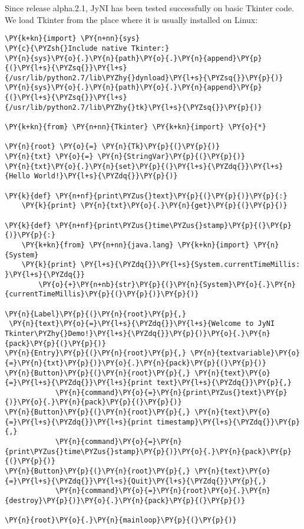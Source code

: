 \documentclass[letterpaper,compsoc,twoside]{IEEEtran}
\makeatletter
\def\PY@reset{\let\PY@it=\relax \let\PY@bf=\relax \let\PY@ul=\relax \let\PY@tc=\relax \let\PY@bc=\relax \let\PY@ff=\relax}
\def\PY@tok#1{\csname PY@tok@#1\endcsname}
\def\PY@toks#1+{\ifx\relax#1\empty\else \PY@tok{#1}\expandafter\PY@toks\fi}
\def\PY@do#1{\PY@bc{\PY@tc{\PY@ul{\PY@it{\PY@bf{\PY@ff{#1}}}}}}}
\def\PY#1#2{\PY@reset\PY@toks#1+\relax+\PY@do{#2}}
\def\PYZus{\char`\_}
\def\PYZsh{\char`\#}
\def\PYZhy{\char`\-}
\def\PYZsq{\char`\'}
\def\PYZdq{\char`\"}
\makeatother
\begin{document}
Since release alpha.2.1, JyNI has been tested successfully on basic Tkinter code.
We load Tkinter from the place where it is usually installed on Linux:\begin{Verbatim}[commandchars=\\\{\},fontsize=\footnotesize]
\PY{k+kn}{import} \PY{n+nn}{sys}
\PY{c}{\PYZsh{}Include native Tkinter:}
\PY{n}{sys}\PY{o}{.}\PY{n}{path}\PY{o}{.}\PY{n}{append}\PY{p}{(}\PY{l+s}{\PYZsq{}}\PY{l+s}{/usr/lib/python2.7/lib\PYZhy{}dynload}\PY{l+s}{\PYZsq{}}\PY{p}{)}
\PY{n}{sys}\PY{o}{.}\PY{n}{path}\PY{o}{.}\PY{n}{append}\PY{p}{(}\PY{l+s}{\PYZsq{}}\PY{l+s}{/usr/lib/python2.7/lib\PYZhy{}tk}\PY{l+s}{\PYZsq{}}\PY{p}{)}

\PY{k+kn}{from} \PY{n+nn}{Tkinter} \PY{k+kn}{import} \PY{o}{*}

\PY{n}{root} \PY{o}{=} \PY{n}{Tk}\PY{p}{(}\PY{p}{)}
\PY{n}{txt} \PY{o}{=} \PY{n}{StringVar}\PY{p}{(}\PY{p}{)}
\PY{n}{txt}\PY{o}{.}\PY{n}{set}\PY{p}{(}\PY{l+s}{\PYZdq{}}\PY{l+s}{Hello World!}\PY{l+s}{\PYZdq{}}\PY{p}{)}

\PY{k}{def} \PY{n+nf}{print\PYZus{}text}\PY{p}{(}\PY{p}{)}\PY{p}{:}
    \PY{k}{print} \PY{n}{txt}\PY{o}{.}\PY{n}{get}\PY{p}{(}\PY{p}{)}

\PY{k}{def} \PY{n+nf}{print\PYZus{}time\PYZus{}stamp}\PY{p}{(}\PY{p}{)}\PY{p}{:}
    \PY{k+kn}{from} \PY{n+nn}{java.lang} \PY{k+kn}{import} \PY{n}{System}
    \PY{k}{print} \PY{l+s}{\PYZdq{}}\PY{l+s}{System.currentTimeMillis: }\PY{l+s}{\PYZdq{}}
        \PY{o}{+}\PY{n+nb}{str}\PY{p}{(}\PY{n}{System}\PY{o}{.}\PY{n}{currentTimeMillis}\PY{p}{(}\PY{p}{)}\PY{p}{)}

\PY{n}{Label}\PY{p}{(}\PY{n}{root}\PY{p}{,}
 \PY{n}{text}\PY{o}{=}\PY{l+s}{\PYZdq{}}\PY{l+s}{Welcome to JyNI Tkinter\PYZhy{}Demo!}\PY{l+s}{\PYZdq{}}\PY{p}{)}\PY{o}{.}\PY{n}{pack}\PY{p}{(}\PY{p}{)}
\PY{n}{Entry}\PY{p}{(}\PY{n}{root}\PY{p}{,} \PY{n}{textvariable}\PY{o}{=}\PY{n}{txt}\PY{p}{)}\PY{o}{.}\PY{n}{pack}\PY{p}{(}\PY{p}{)}
\PY{n}{Button}\PY{p}{(}\PY{n}{root}\PY{p}{,} \PY{n}{text}\PY{o}{=}\PY{l+s}{\PYZdq{}}\PY{l+s}{print text}\PY{l+s}{\PYZdq{}}\PY{p}{,}
            \PY{n}{command}\PY{o}{=}\PY{n}{print\PYZus{}text}\PY{p}{)}\PY{o}{.}\PY{n}{pack}\PY{p}{(}\PY{p}{)}
\PY{n}{Button}\PY{p}{(}\PY{n}{root}\PY{p}{,} \PY{n}{text}\PY{o}{=}\PY{l+s}{\PYZdq{}}\PY{l+s}{print timestamp}\PY{l+s}{\PYZdq{}}\PY{p}{,}
            \PY{n}{command}\PY{o}{=}\PY{n}{print\PYZus{}time\PYZus{}stamp}\PY{p}{)}\PY{o}{.}\PY{n}{pack}\PY{p}{(}\PY{p}{)}
\PY{n}{Button}\PY{p}{(}\PY{n}{root}\PY{p}{,} \PY{n}{text}\PY{o}{=}\PY{l+s}{\PYZdq{}}\PY{l+s}{Quit}\PY{l+s}{\PYZdq{}}\PY{p}{,}
            \PY{n}{command}\PY{o}{=}\PY{n}{root}\PY{o}{.}\PY{n}{destroy}\PY{p}{)}\PY{o}{.}\PY{n}{pack}\PY{p}{(}\PY{p}{)}

\PY{n}{root}\PY{o}{.}\PY{n}{mainloop}\PY{p}{(}\PY{p}{)}
\end{Verbatim}
\end{document}
